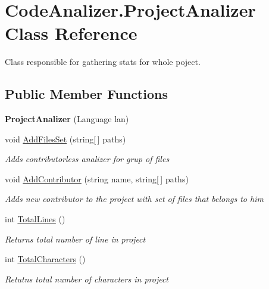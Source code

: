 \hypertarget{class_code_analizer_1_1_project_analizer}{}\section{Code\+Analizer.\+Project\+Analizer Class Reference}
\label{class_code_analizer_1_1_project_analizer}


Class responsible for gathering stats for whole poject.  


\subsection*{Public Member Functions}
\begin{DoxyCompactItemize}
\item 
\mbox{\label{class_code_analizer_1_1_project_analizer_a026750a4cb467401184655aba3e2f963}} 
{\bfseries Project\+Analizer} (Language lan)
\item 
void \mbox{\hyperlink{class_code_analizer_1_1_project_analizer_a4ed8fe8129186288a99dedd7b4966b2b}{Add\+Files\+Set}} (string\mbox{[}$\,$\mbox{]} paths)
\begin{DoxyCompactList}\small\item\em Adds contributorless analizer for grup of files \end{DoxyCompactList}\item 
void \mbox{\hyperlink{class_code_analizer_1_1_project_analizer_a211cc82430d4b716fde6425c3d919be3}{Add\+Contributor}} (string name, string\mbox{[}$\,$\mbox{]} paths)
\begin{DoxyCompactList}\small\item\em Adds new contributor to the project with set of files that belongs to him \end{DoxyCompactList}\item 
int \mbox{\hyperlink{class_code_analizer_1_1_project_analizer_aad0869b232a62de023d48dda1edb9766}{Total\+Lines}} ()
\begin{DoxyCompactList}\small\item\em Returns total number of line in project \end{DoxyCompactList}\item 
int \mbox{\hyperlink{class_code_analizer_1_1_project_analizer_a8e4045d90ae317a8172e3ee5236fb0f6}{Total\+Characters}} ()
\begin{DoxyCompactList}\small\item\em Retutns total number of characters in project \end{DoxyCompactList}\item 

\end{DoxyCompactItemize}
